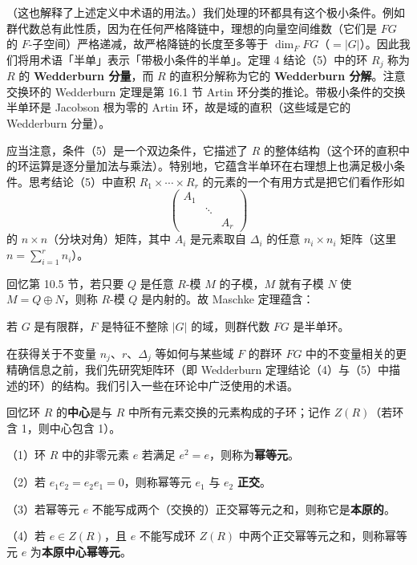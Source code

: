 （这也解释了上述定义中术语的用法。）我们处理的环都具有这个极小条件。例如群代数总有此性质，因为在任何严格降链中，理想的向量空间维数（它们是 \(FG\) 的 \(F\)-子空间）严格递减，故严格降链的长度至多等于 \(\dim_F FG\)（\(= |G|\)）。因此我们将用术语「半单」表示「带极小条件的半单」。定理 4 结论（5）中的环 \(R_j\) 称为 \(R\) 的 \textbf{Wedderburn 分量}，而 \(R\) 的直积分解称为它的 \textbf{Wedderburn 分解}。注意交换环的 Wedderburn 定理是第 16.1 节 Artin 环分类的推论。带极小条件的交换半单环是 Jacobson 根为零的 Artin 环，故是域的直积（这些域是它的 Wedderburn 分量）。

应当注意，条件（5）是一个双边条件，它描述了 \(R\) 的整体结构（这个环的直积中的环运算是逐分量加法与乘法）。特别地，它蕴含半单环在右理想上也满足极小条件。思考结论（5）中直积 \(R_1 \times \cdots \times R_r\) 的元素的一个有用方式是把它们看作形如
\[
\begin{pmatrix}
A_1 & & \\
& \ddots & \\
& & A_r
\end{pmatrix}
\]
的 \(n \times n\)（分块对角）矩阵，其中 \(A_i\) 是元素取自 \(\Delta_i\) 的任意 \(n_i \times n_i\) 矩阵（这里 \(n = \sum_{i=1}^{r}n_i\)）。

回忆第 10.5 节，若只要 \(Q\) 是任意 \(R\)-模 \(M\) 的子模，\(M\) 就有子模 \(N\) 使 \(M = Q \oplus N\)，则称 \(R\)-模 \(Q\) 是内射的。故 Maschke 定理蕴含：

\begin{corollary}\label{cor:18.5}
若 \(G\) 是有限群，\(F\) 是特征不整除 \(|G|\) 的域，则群代数 \(FG\) 是半单环。
\end{corollary}

在获得关于不变量 \(n_j\)、\(r\)、\(\Delta_j\) 等如何与某些域 \(F\) 的群环 \(FG\) 中的不变量相关的更精确信息之前，我们先研究矩阵环（即 Wedderburn 定理结论（4）与（5）中描述的环）的结构。我们引入一些在环论中广泛使用的术语。

回忆环 \(R\) 的\textbf{中心}是与 \(R\) 中所有元素交换的元素构成的子环；记作 \(Z(R)\)（若环含 1，则中心包含 1）。

\begin{definition}
（1）环 \(R\) 中的非零元素 \(e\) 若满足 \(e^2 = e\)，则称为\textbf{幂等元}。

（2）若 \(e_1e_2 = e_2e_1 = 0\)，则称幂等元 \(e_1\) 与 \(e_2\) \textbf{正交}。

（3）若幂等元 \(e\) 不能写成两个（交换的）正交幂等元之和，则称它是\textbf{本原的}。

（4）若 \(e \in Z(R)\)，且 \(e\) 不能写成环 \(Z(R)\) 中两个正交幂等元之和，则称幂等元 \(e\) 为\textbf{本原中心幂等元}。
\end{definition}


